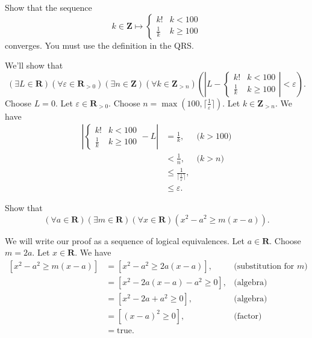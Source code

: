 \documentclass[12pt,fleqn,answers]{exam}
\newcommand{\reals}{\mathbf{R}}
\newcommand{\integers}{\mathbf{Z}}
\newcommand{\true}{\mbox{true}}
\begin{document}
\begin{questions}
\begin{solution}
\end{solution}


\question Show that the sequence
\[
    k \in \integers \mapsto \begin{cases} k!  & k < 100\\
        \frac{1}{k}  & k \geq  100 \end{cases}
\]
converges. You must use the definition in the QRS.

\begin{solution}
We'll show that
\[
 (\exists L \in \reals)
 (\forall \varepsilon \in \reals_{>0})
 (\exists n \in \integers)
(\forall k \in \integers_{>n}) 
\left ( \left | L - \begin{cases} k!  & k < 100\\
  \frac{1}{k}  & k \geq  100 \end{cases} \right | < \varepsilon \right ).
\]
Choose $L=0$. Let \(\varepsilon \in \reals_{>0} \).
Choose $n = \max(100, \lceil \frac{1}{\varepsilon} \rceil)$.
Let $k \in \integers_{>n}$. We have
\begin{align*}
  \left | \begin{cases} k!  & k < 100\\
    \frac{1}{k}  & k \geq  100 \end{cases} - L \right |
    &= \frac{1}{k}, &\mbox{($k > 100$)}  \\
    &< \frac{1}{n}, &\mbox{($k > n$)}\\
    &\leq \frac{1}{\lceil \frac{1}{\varepsilon} \rceil},\\
    &\leq \varepsilon.
\end{align*}
\end{solution}

\question Show that
\[
    \left(\forall a \in \reals \right) \left(\exists m \in \reals \right)
    \left(\forall x \in \reals \right) \left(x^2 - a^2 \geq m (x-a) \right).
\]
\begin{solution}
  We will write our proof as a sequence of logical 
  equivalences.   Let $a \in \reals$. Choose $m = 2 a$. Let $x \in \reals$. We have
  \begin{align*}
    \left [x^2 - a^2 \geq m (x-a) \right ] &=
    \left [x^2 - a^2 \geq 2a  (x-a) \right ], &\mbox{(substitution for $m$)} \\
    &=
    \left [x^2 -2 a (x-a) - a^2 \geq 0 \right ],  &\mbox{(algebra)}\\
    &=
    \left [x^2 -2 a  + a^2 \geq 0 \right ], &\mbox{(algebra)} \\
    &=
    \left [(x - a)^2 \geq 0 \right ], &\mbox{(factor)} \\
    &=
    \true.
  \end{align*}
  
 
\end{solution}

\end{questions}
\end{document}
